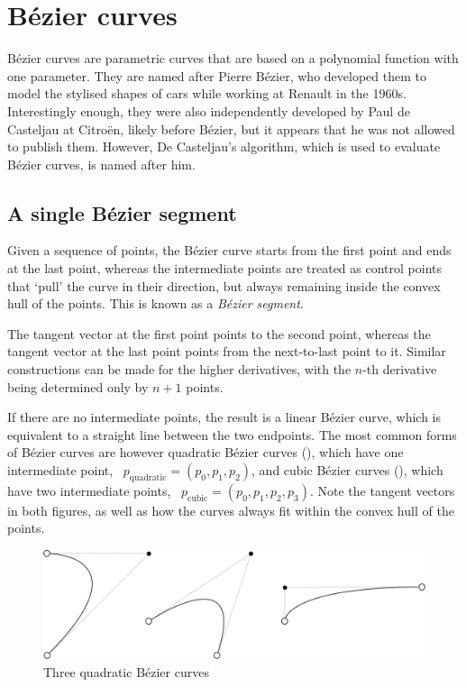 \section{B\'ezier curves}

B\'ezier curves are parametric curves that are based on a polynomial function with one parameter.
They are named after Pierre B\'ezier, who developed them to model the stylised shapes of cars while working at Renault in the 1960s.
Interestingly enough, they were also independently developed by Paul de Casteljau at Citro\"en, likely before B\'ezier, but it appears that he was not allowed to publish them.
However, De Casteljau's algorithm, which is used to evaluate B\'ezier curves, is named after him.

\subsection{A single B\'ezier segment}

Given a sequence of points, the B\'ezier curve starts from the first point and ends at the last point, whereas the intermediate points are treated as control points that `pull' the curve in their direction, but always remaining inside the convex hull of the points.
This is known as a \emph{B\'ezier segment}.

The tangent vector at the first point points to the second point, whereas the tangent vector at the last point points from the next-to-last point to it.
Similar constructions can be made for the higher derivatives, with the \(n\)-th derivative being determined only by \(n+1\) points.

If there are no intermediate points, the result is a linear B\'ezier curve, which is equivalent to a straight line between the two endpoints.
The most common forms of B\'ezier curves are however quadratic B\'ezier curves (), which have one intermediate point, \eg\ \(p_{\mathrm{quadratic}} = (p_0, p_1, p_2)\), and cubic B\'ezier curves (), which have two intermediate points, \eg\ \(p_{\mathrm{cubic}} = (p_0, p_1, p_2, p_3)\).
Note the tangent vectors in both figures, as well as how the curves always fit within the convex hull of the points.

\begin{figure}
\centering
\includegraphics[width=\linewidth]{figs/quadratic}
\caption{Three quadratic B\'ezier curves}%
\label{fig:quadratic}
\end{figure}

